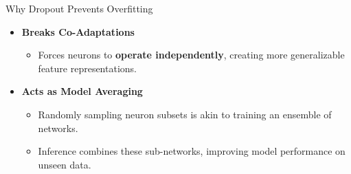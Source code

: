 \documentclass[serif, aspectratio=169]{beamer}
\begin{document}
\begin{frame}{Why Dropout Prevents Overfitting}
    \begin{itemize}
        \item \textbf{Breaks Co-Adaptations}
            \begin{itemize}
                \item Forces neurons to \textbf{operate independently}, creating more generalizable feature representations.
            \end{itemize}
        \item \textbf{Acts as Model Averaging}
            \begin{itemize}
                \item Randomly sampling neuron subsets is akin to training an ensemble of networks.
                \item Inference combines these sub-networks, improving model performance on unseen data.
            \end{itemize}
    \end{itemize}
\end{frame}
\end{document}
